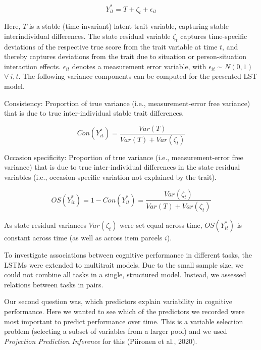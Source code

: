 \documentclass[
  man,floatsintext]{apa6}
\begin{document}
\begin{equation}
Y^*_{it}= T + \zeta_t + \epsilon_{it}
\end{equation}

Here, \(T\) is a stable (time-invariant) latent trait variable, capturing stable interindividual differences. The state residual variable \(\zeta_t\) captures time-specific deviations of the respective true score from the trait variable at time \(t\), and thereby captures deviations from the trait due to situation or person-situation interaction effects. \(\epsilon_{it}\) denotes a measurement error variable, with \(\epsilon_{it} \sim N(0,1)\) \(\forall~ i,t\). The following variance components can be computed for the presented LST model.

Consistency: Proportion of true variance (i.e., measurement-error free variance) that is due to true inter-individual stable trait differences.

\begin{equation}
Con(Y^*_{it})=\frac{Var(T)}{Var(T)+Var(\zeta_t)}
\end{equation}

Occasion specificity: Proportion of true variance (i.e., measurement-error free variance) that is due to true inter-individual differences in the state residual variables (i.e., occasion-specific variation not explained by the trait).

\begin{equation}
OS(Y^*_{it})=1-Con(Y^*_{it}) = \frac{Var(\zeta_t)}{Var(T)+Var(\zeta_t)}
\end{equation}

As state residual variances \(Var(\zeta_t)\) were set equal across time, \(OS(Y^*_{it})\) is constant across time (as well as across item parcels \(i\)).

To investigate associations between cognitive performance in different tasks, the LSTMs were extended to multitrait models. Due to the small sample size, we could not combine all tasks in a single, structured model. Instead, we assessed relations between tasks in pairs.

Our second question was, which predictors explain variability in cognitive performance. Here we wanted to see which of the predictors we recorded were most important to predict performance over time. This is a variable selection problem (selecting a subset of variables from a larger pool) and we used \emph{Projection Prediction Inference} for this (Piironen et al., 2020).

\newpage
\end{document}
